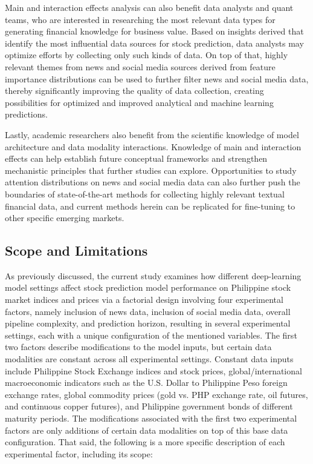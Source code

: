 \documentclass[stu,floatsintext]{apa7}
\begin{document}
Main and interaction effects analysis can also benefit data analysts and quant teams, who are interested in researching the most relevant data types for generating financial knowledge for business value. Based on insights derived that identify the most influential data sources for stock prediction, data analysts may optimize efforts by collecting only such kinds of data. On top of that, highly relevant themes from news and social media sources derived from feature importance distributions can be used to further filter news and social media data, thereby significantly improving the quality of data collection, creating possibilities for optimized and improved analytical and machine learning predictions.

Lastly, academic researchers also benefit from the scientific knowledge of model architecture and data modality interactions. Knowledge of main and interaction effects can help establish future conceptual frameworks and strengthen mechanistic principles that further studies can explore. Opportunities to study attention distributions on news and social media data can also further push the boundaries of state-of-the-art methods for collecting highly relevant textual financial data, and current methods herein can be replicated for fine-tuning to other specific emerging markets.

\subsection{Scope and Limitations}

As previously discussed, the current study examines how different deep-learning model settings affect stock prediction model performance on Philippine stock market indices and prices via a factorial design involving four experimental factors, namely inclusion of news data, inclusion of social media data, overall pipeline complexity, and prediction horizon, resulting in several experimental settings, each with a unique configuration of the mentioned variables. The first two factors describe modifications to the model inputs, but certain data modalities are constant across all experimental settings. Constant data inputs include Philippine Stock Exchange indices and stock prices, global/international macroeconomic indicators such as the U.S. Dollar to Philippine Peso foreign exchange rates, global commodity prices (gold vs. PHP exchange rate, oil futures, and continuous copper futures), and Philippine government bonds of different maturity periods. The modifications associated with the first two experimental factors are only additions of certain data modalities on top of this base data configuration. That said, the following is a more specific description of each experimental factor, including its scope:
\end{document}
